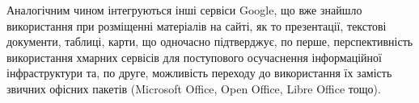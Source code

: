 
Аналогічним чином інтегруються інші сервіси Google, що вже знайшло використання при розміщенні матеріалів на сайті, як то презентації, текстові документи, таблиці, карти, що одночасно підтверджує, по перше, перспективність використання хмарних сервісів для поступового осучаснення інформаційної інфраструктури та, по друге, можливість переходу до використання їх замість звичних офісних пакетів (Microsoft Office, Open Office, Libre Office тощо).